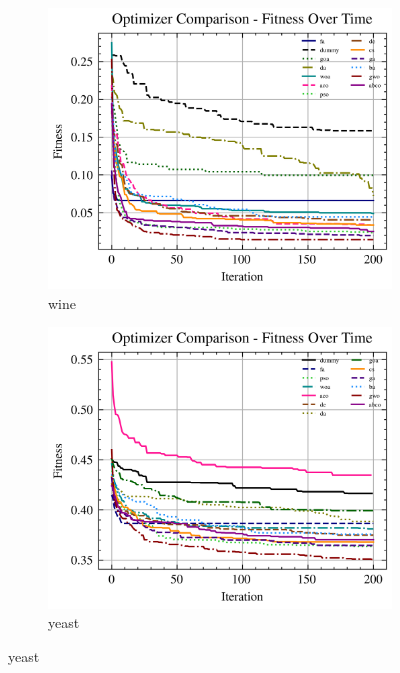 \begin{figure}[htb]
    \begin{subfigure}[b]{0.45\textwidth}
        \includegraphics[width=\textwidth]{imagenes/fitness_charts/img/binary/wine/optimizers_fitness_svc.png}
        \caption{wine}
        \label{fig:convergencia_wine_svc}
    \end{subfigure}
    \begin{subfigure}[b]{0.45\textwidth}
        \includegraphics[width=\textwidth]{imagenes/fitness_charts/img/binary/yeast/optimizers_fitness_svc.png}
        \caption{yeast}
        \label{fig:convergencia_yeast_svc}
    \end{subfigure}


\end{figure}
